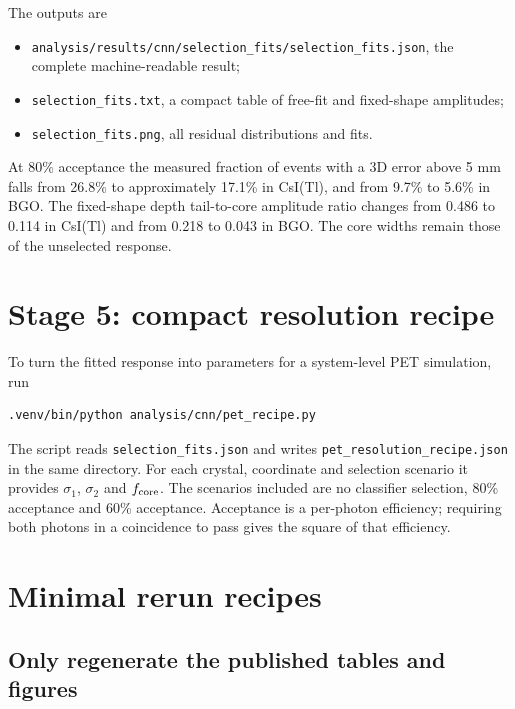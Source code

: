 \documentclass[11pt,a4paper]{article}
\newcommand{\code}[1]{\nolinkurl{#1}}
\newcommand{\csitl}{CsI(Tl)}
\begin{document}
The outputs are

\begin{itemize}
  \item \code{analysis/results/cnn/selection\_fits/selection\_fits.json}, the
  complete machine-readable result;
  \item \code{selection\_fits.txt}, a compact table of free-fit and fixed-shape
  amplitudes;
  \item \code{selection\_fits.png}, all residual distributions and fits.
\end{itemize}

At 80\% acceptance the measured fraction of events with a 3D error above 5 mm
falls from 26.8\% to approximately 17.1\% in \csitl{}, and from 9.7\% to 5.6\%
in BGO. The fixed-shape depth tail-to-core amplitude ratio changes from 0.486 to
0.114 in \csitl{} and from 0.218 to 0.043 in BGO. The core widths remain those
of the unselected response.

\section{Stage 5: compact resolution recipe}

To turn the fitted response into parameters for a system-level PET simulation,
run

\begin{verbatim}
.venv/bin/python analysis/cnn/pet_recipe.py
\end{verbatim}

The script reads \code{selection\_fits.json} and writes
\code{pet\_resolution\_recipe.json} in the same directory. For each crystal,
coordinate and selection scenario it provides $\sigma_1$, $\sigma_2$ and
$f_{\rm core}$. The scenarios included are no classifier selection, 80\%
acceptance and 60\% acceptance. Acceptance is a per-photon efficiency; requiring
both photons in a coincidence to pass gives the square of that efficiency.

\section{Minimal rerun recipes}

\subsection*{Only regenerate the published tables and figures}
\end{document}

